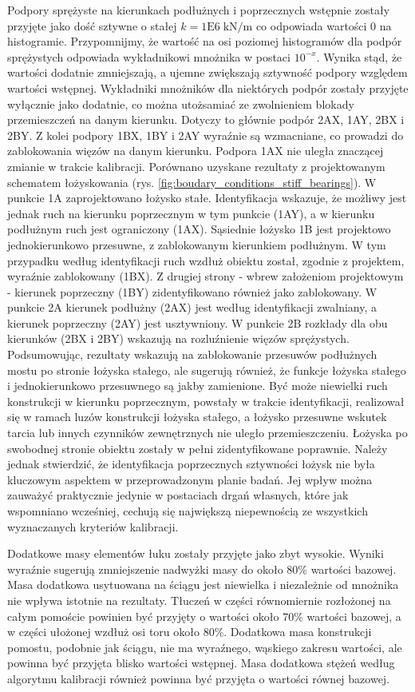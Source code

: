 Podpory sprężyste na kierunkach podłużnych i poprzecznych wstępnie zostały przyjęte jako dość sztywne o stałej $k=1\mathrm{E}6\;\mathrm{kN/m}$ co odpowiada wartości 0 na histogramie. Przypomnijmy, że wartość na osi poziomej histogramów dla podpór sprężystych odpowiada wykładnikowi mnożnika w postaci $10^{-x}$. Wynika stąd, że wartości dodatnie zmniejszają, a ujemne zwiększają sztywność podpory względem wartości wstępnej. Wykładniki mnożników dla niektórych podpór zostały przyjęte wyłącznie jako dodatnie, co można utożsamiać ze zwolnieniem blokady przemieszczeń na danym kierunku. Dotyczy to głównie podpór 2AX, 1AY, 2BX i 2BY. Z kolei podpory 1BX, 1BY i 2AY wyraźnie są wzmacniane, co prowadzi do zablokowania więzów na danym kierunku. Podpora 1AX nie uległa znaczącej zmianie w trakcie kalibracji. Porównano uzyskane rezultaty z projektowanym schematem łożyskowania (rys. \ref{fig:boudary_conditions_stiff_bearings}). W punkcie 1A zaprojektowano łożysko stałe. Identyfikacja wskazuje, że możliwy jest jednak ruch na kierunku poprzecznym w tym punkcie (1AY), a w kierunku podłużnym ruch jest ograniczony (1AX). Sąsiednie łożysko 1B jest projektowo jednokierunkowo przesuwne, z zablokowanym kierunkiem podłużnym. W tym przypadku według identyfikacji ruch wzdłuż obiektu został, zgodnie z projektem, wyraźnie zablokowany (1BX). Z drugiej strony - wbrew założeniom projektowym - kierunek poprzeczny (1BY) zidentyfikowano również jako zablokowany. W punkcie 2A kierunek podłużny (2AX) jest według identyfikacji zwalniany, a kierunek poprzeczny (2AY) jest usztywniony. W punkcie 2B rozkłady dla obu kierunków (2BX i 2BY) wskazują na rozluźnienie więzów sprężystych. Podsumowując, rezultaty wskazują na zablokowanie przesuwów podłużnych mostu po stronie łożyska stałego, ale sugerują również, że funkcje łożyska stałego i jednokierunkowo przesuwnego są jakby zamienione. Być może niewielki ruch konstrukcji w kierunku poprzecznym, powstały w trakcie identyfikacji, realizował się w ramach luzów konstrukcji łożyska stałego, a łożysko przesuwne wskutek tarcia lub innych czynników zewnętrznych nie uległo przemieszczeniu. Łożyska po swobodnej stronie obiektu zostały w pełni zidentyfikowane poprawnie. Należy jednak stwierdzić, że identyfikacja poprzecznych sztywności łożysk nie była kluczowym aspektem w przeprowadzonym planie badań. Jej wpływ można zauważyć praktycznie jedynie w postaciach drgań własnych, które jak wspomniano wcześniej, cechują się największą niepewnością ze wszystkich wyznaczanych kryteriów kalibracji. 

Dodatkowe masy elementów łuku zostały przyjęte jako zbyt wysokie. Wyniki wyraźnie sugerują zmniejszenie nadwyżki masy do około 80\% wartości bazowej. Masa dodatkowa usytuowana na ściągu jest niewielka i niezależnie od mnożnika nie wpływa istotnie na rezultaty. Tłuczeń w części równomiernie rozłożonej na całym pomoście powinien być przyjęty o wartości około 70\% wartości bazowej, a w części ułożonej wzdłuż osi toru około 80\%. Dodatkowa masa konstrukcji pomostu, podobnie jak ściągu, nie ma wyraźnego, wąskiego zakresu wartości, ale powinna być przyjęta blisko wartości wstępnej. Masa dodatkowa stężeń według algorytmu kalibracji również powinna być przyjęta o wartości równej bazowej. 

